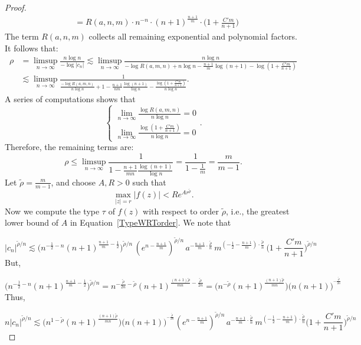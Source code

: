 \documentclass[graybox]{svmult}
\begin{document}
\begin{proof}
\begin{align}
               &=  R(a,n,m)\cdot n^{-n}\cdot(n+1)^{\frac{n+1}{m}}\cdot\Big(1 + \frac{C'm}{n+1}\Big) \nonumber
        \end{align}
The term $R(a,n,m)$ collects all remaining exponential and polynomial factors. It follows that:
\begin{align*}
    \rho &= \limsup_{n\to\infty} \frac{n \log n}{-\log|c_n|} \lesssim \limsup_{n\to\infty} \frac{n\log n}{-\log R(a,m,n) + n\log n -\frac{n+1}{m}\log(n+1)- \log(1+\frac{C'm}{n+1})}\\
    &\lesssim \limsup_{n\to\infty} \frac{1}{\frac{-\log R(a,m,n)}{n\log n} + 1 -\frac{n+1}{nm}\frac{\log(n+1)}{\log n}- \frac{\log(1+\frac{C'm}{n+1})}{n\log n}}.
\end{align*}
A series of computations shows that $$\begin{cases} \lim_{n\to \infty}\frac{\log R(a,m,n)}{n\log n} =0\\ \lim_{n\to \infty}\frac{\log(1+ \frac{C'm}{n+1})}{n\log n}=0\end{cases}.$$  Therefore, the remaining terms are:
\begin{equation*}   
    \rho \leq \limsup_{n\to \infty}\frac{1}{1-\frac{n+1}{mn}\frac{\log(n+1)}{\log n}}= \frac{1}{1- \frac{1}{m}} = \frac{m}{m-1}.
\end{equation*}
Let $\tilde{\rho} = \frac{m}{m-1}$, and choose $A,R >0$ such that 
\begin{equation}\label{TypeWRTorder}
    \max_{|z|= r}|f(z)| < Re^{Ar^{\tilde{\rho}}}.    
\end{equation}
Now we compute the type $\tau$ of $f(z)$ with respect to order $\tilde{\rho}$, i.e., the greatest lower bound of $A$ in Equation~\eqref{TypeWRTorder}. We note that 

$$ |c_n|^{\tilde{\rho}/n} \lesssim \Big(n^{-\frac{1}{2}-n}(n+1)^{\frac{n+1}{m}-\frac{1}{2}}\Big)^{\tilde{\rho}/n}\, (e^{n - \frac{n+1}{m}})^{\tilde{\rho}/n}\, a^{-\frac{n+1}{m}\cdot \frac{\tilde{\rho}}{n}} \, m ^{(-\frac{1}{2}-\frac{n+1}{m})\cdot \frac{\tilde{\rho}}{n}}\, \Big(1 + \frac{C'm}{n+1}\Big)^{\tilde{\rho}/n} $$ But,

$$\Big(n^{-\frac{1}{2}-n}(n+1)^{\frac{n+1}{m}-\frac{1}{2}}\Big)^{\tilde{\rho}/n} = n^{-\frac{\tilde{\rho}}{2n}-\tilde{\rho}}(n+1)^{\frac{(n+1)\tilde{\rho}}{mn}-\frac{\tilde{\rho}}{2n}}=\Big(n^{-\tilde{\rho}}(n+1)^{\frac{(n+1)\tilde{\rho}}{mn}}\Big)\Big( n(n+1) \Big)^{^{-\frac{\tilde{\rho}}{2n}}}$$
Thus,

$$n|c_n|^{\tilde{\rho}/n}\lesssim  \Big(n^{1-\tilde{\rho}}(n+1)^{\frac{(n+1)\tilde{\rho}}{mn}}\Big)\Big( n(n+1) \Big)^{^{-\frac{\tilde{\rho}}{2n}}}(e^{n - \frac{n+1}{m}})^{\tilde{\rho}/n}\, a^{-\frac{n+1}{m}\cdot \frac{\tilde{\rho}}{n}} \, m ^{(-\frac{1}{2}-\frac{n+1}{m})\cdot \frac{\tilde{\rho}}{n}}\Big(1 + \frac{C'm}{n+1}\Big)^{\tilde{\rho}/n}$$


\end{proof}
\end{document}
